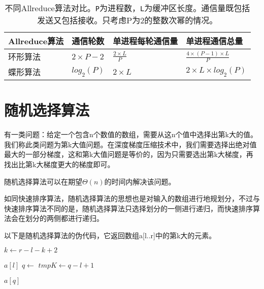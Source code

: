 \begin{table}[htb]
    \centering
    \caption[不同Allreduce算法对比]{不同Allreduce算法对比。\texttt{P}为进程数，\texttt{L}为缓冲区长度。通信量既包括发送又包括接收。只考虑P为2的整数次幂的情况。}
    \label{tab:Allreduce}
    \begin{tabularx}{\linewidth}{lXXX}
        \toprule[1.5pt]
        {Allreduce算法} & {通信轮数} & {单进程每轮通信量} & {单进程通信总量}\\\midrule[1pt]
        环形算法 & $2 \times P - 2$ & $\frac{2 \times L}{P}$ & $ \frac{4 \times (P - 1)\times L}{P}$\\
        蝶形算法 & $log_2(P)$ & $2\times L$ & $2 \times L \times log_2(P)$\\
        \bottomrule[1.5pt]
    \end{tabularx}
\end{table}

\section{随机选择算法}
有一类问题：给定一个包含n个数值的数组，需要从这n个值中选择出第k大的值。我们称此类问题为第k大值问题。在深度梯度压缩技术中，我们需要选择出绝对值最大的一部分梯度，这和第k大值问题是等价的，因为只需要选出第k大梯度，再找出比第k大梯度更大的梯度即可。

随机选择算法\cite{IntroToAlgo}可以在期望$\Theta(n)$的时间内解决该问题。

如同快速排序算法，随机选择算法的思想也是对输入的数组进行地规划分，不过与快速排序算法不同的是，随机选择算法只选择划分的一侧进行递归，而快速排序算法会在划分的两侧都进行递归。

以下是随机选择算法的伪代码，它返回数组a[l..r]中的第k大的元素。


\makeatletter
\def\BState{\State\hskip-\ALG@thistlm}
\makeatother
\begin{algorithm}
\begin{algorithmic}[1]
\State $k \gets r - l - k + 2$

\Return $a[l]$
\EndIf
\State $q \gets $ 
\State $tmpK \gets q - l + 1$

\Return $a[q]$

\Return {}
\Else

\Return {}
\EndIf
\EndProcedure
\end{algorithmic}
\end{algorithm}

